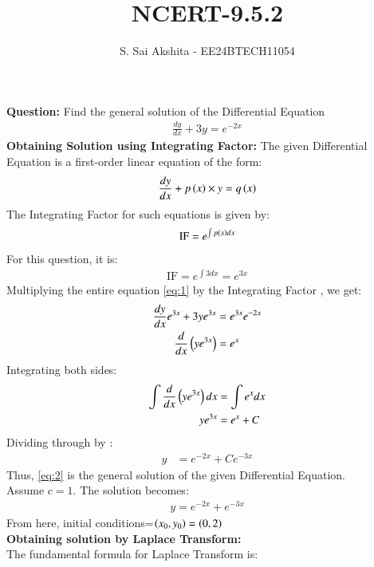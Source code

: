 \documentclass[journal,12pt,onecolumn]{IEEEtran}
\theoremstyle{remark}
\begin{document}

\vspace{3cm}

\title{NCERT-9.5.2}
\author{S. Sai Akshita - EE24BTECH11054}
\newpage
\maketitle
\bigskip

\renewcommand{\thefigure}{\theenumi}
\renewcommand{\thetable}{\theenumi}
\textbf{Question:}
Find the general solution of the Differential Equation
\begin{align}
\frac{dy}{dx} + 3y = e^{-2x} \label{eq:1}
\end{align}
\textbf{Obtaining Solution using Integrating Factor:}
The given Differential Equation is a first-order linear equation of the form:
\begin{align}
\frac{dy}{dx} + p\left(x\right)\times y = q\left(x\right)
\end{align}
The Integrating Factor for such equations is given by:
\begin{align}
\text{IF} = e^{\int p\left(x\right)dx}
\end{align}
For this question, it is:
\begin{align}
\text{IF} = e^{\int 3dx} = e^{3x}
\end{align}
Multiplying the entire equation \eqref{eq:1} by the Integrating Factor , we get:
\begin{align}
\frac{dy}{dx} e^{3x} + 3y e^{3x} &= e^{3x} e^{-2x} \\
\frac{d}{dx}\left(ye^{3x}\right) &= e^{x}
\end{align}
Integrating both sides:
\begin{align}
\int \frac{d}{dx}\left(ye^{3x}\right) dx &= \int e^{x} dx \\
ye^{3x} &= e^{x} + C
\end{align}
Dividing through by :
\begin{align}
y &= e^{-2x} + Ce^{-3x} \label{eq:2}
\end{align}
Thus, \eqref{eq:2} is the general solution of the given Differential Equation.\\
Assume $c=1$. The solution becomes:
\begin{align}
y = e^{-2x} + e^{-3x} \label{eq:3}
\end{align}
From here, initial conditions=$\left(x_0,y_0\right)=\left(0,2\right)$\\
\textbf{Obtaining solution by Laplace Transform:}\\
The fundamental formula for Laplace Transform is:\\
\end{document}
